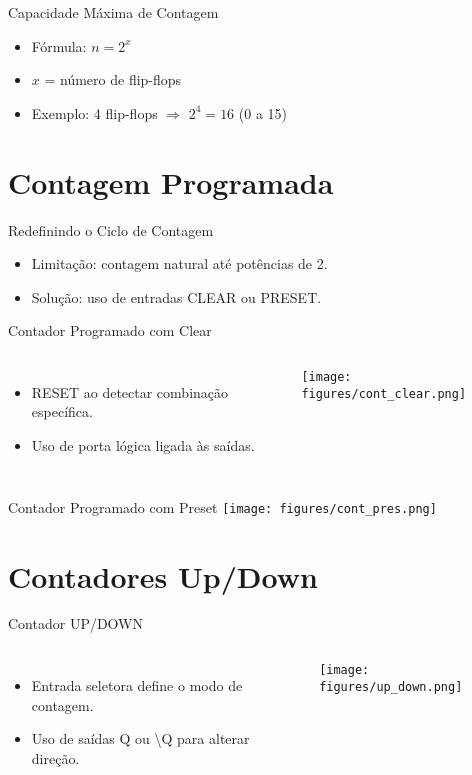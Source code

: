 \documentclass{beamer}
\begin{document}
\begin{frame}{Capacidade Máxima de Contagem}
\begin{itemize}
  \item Fórmula: \( n = 2^x \)
  \item \( x \) = número de flip-flops
  \item Exemplo: 4 flip-flops \(\Rightarrow\) \( 2^4 = 16 \) (0 a 15)
\end{itemize}
\end{frame}

\section{Contagem Programada}

\begin{frame}{Redefinindo o Ciclo de Contagem}
\begin{itemize}
  \item Limitação: contagem natural até potências de 2.
  \item Solução: uso de entradas CLEAR ou PRESET.
\end{itemize}
\end{frame}

\begin{frame}{Contador Programado com Clear}
\begin{columns}
\begin{itemize}
  \item RESET ao detectar combinação específica.
  \item Uso de porta lógica ligada às saídas.
\end{itemize}
\texttt{[image: figures/cont\_clear.png]}
\end{columns}
\end{frame}

\begin{frame}{Contador Programado com Preset}
\centering
\texttt{[image: figures/cont\_pres.png]}
\end{frame}

\section{Contadores Up/Down}

\begin{frame}{Contador UP/DOWN}
\begin{columns}
\begin{itemize}
  \item Entrada seletora define o modo de contagem.
  \item Uso de saídas Q ou \textbackslash Q para alterar direção.
\end{itemize}
\texttt{[image: figures/up\_down.png]}
\end{columns}
\end{frame}
\end{document}

